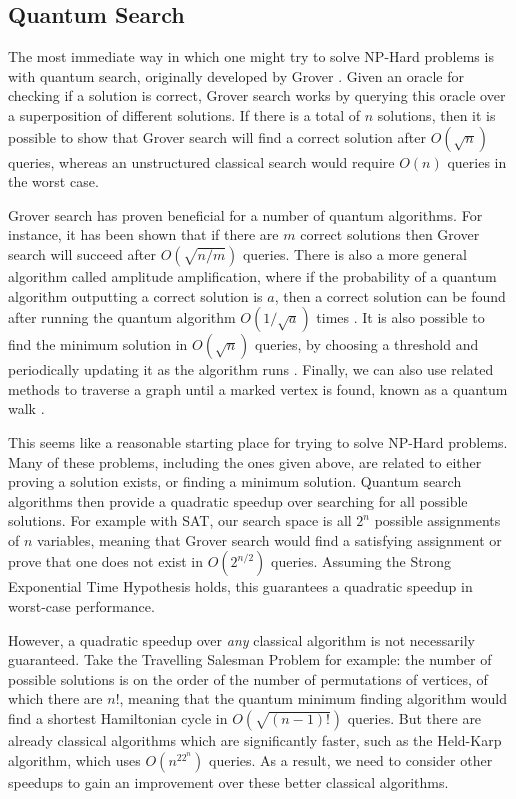 \subsection{Quantum Search}

The most immediate way in which one might try to solve NP-Hard problems is with quantum search, originally developed by Grover \cite{grover96}. Given an oracle for checking if a solution is correct, Grover search works by querying this oracle over a superposition of different solutions. If there is a total of $n$ solutions, then it is possible to show that Grover search will find a correct solution after $O(\sqrt{n})$ queries, whereas an unstructured classical search would require $O(n)$ queries in the worst case.

Grover search has proven beneficial for a number of quantum algorithms. For instance, it has been shown that if there are $m$ correct solutions then Grover search will succeed after $O(\sqrt{n/m})$ queries. There is also a more general algorithm called amplitude amplification, where if the probability of a quantum algorithm outputting a correct solution is $a$, then a correct solution can be found after running the quantum algorithm $O(1/\sqrt{a})$ times \cite{brassard2002}. It is also possible to find the minimum solution in $O(\sqrt{n})$ queries, by choosing a threshold and periodically updating it as the algorithm runs \cite{durr1996}. Finally, we can also use related methods to traverse a graph until a marked vertex is found, known as a quantum walk \cite{childs2003}.

This seems like a reasonable starting place for trying to solve NP-Hard problems. Many of these problems, including the ones given above, are related to either proving a solution exists, or finding a minimum solution. Quantum search algorithms then provide a quadratic speedup over searching for all possible solutions. For example with SAT, our search space is all $2^n$ possible assignments of $n$ variables, meaning that Grover search would find a satisfying assignment or prove that one does not exist in $O(2^{n/2})$ queries. Assuming the Strong Exponential Time Hypothesis holds, this guarantees a quadratic speedup in worst-case performance.

However, a quadratic speedup over \textit{any} classical algorithm is not necessarily guaranteed. Take the Travelling Salesman Problem for example: the number of possible solutions is on the order of the number of permutations of vertices, of which there are $n!$, meaning that the quantum minimum finding algorithm would find a shortest Hamiltonian cycle in $O(\sqrt{(n-1)!})$ queries. But there are already classical algorithms which are significantly faster, such as the Held-Karp algorithm, which uses $O(n^22^n)$ queries. As a result, we need to consider other speedups to gain an improvement over these better classical algorithms.

